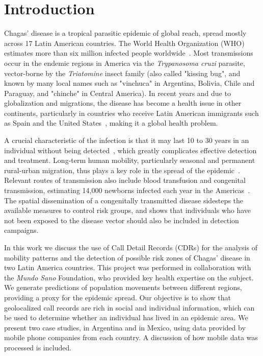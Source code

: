 \section{Introduction}

Chagas' disease is a tropical parasitic epidemic of global reach, spread mostly across 17 Latin American countries. The World Health Organization (WHO) estimates more than six million infected people worldwide~\cite{who2016}. Most transmissions occur in the endemic regions in America via the \textit{Trypanosoma cruzi} parasite, vector-borne by the \textit{Triatomine} insect family (also called "kissing bug", and known by many local names such as "vinchuca" in Argentina, Bolivia, Chile and Paraguay, and "chinche" in Central America). In recent years and due to globalization and migrations, the disease has become a health issue in other continents, particularly in countries who receive Latin American immigrants such as Spain and the United States~\cite{schmunis2010chagas}, making it a global health problem.

A crucial characteristic of the infection is that it may last 10 to 30 years in an individual without being detected~\cite{rassi2012american}, which greatly complicates effective detection and treatment. Long-term human mobility, particularly seasonal and permanent rural-urban migration, thus plays a key role in the spread of the epidemic~\cite{briceno2009chagas}. Relevant routes of transmission also include blood transfusion and congenital transmission, estimating 14,000 newborns infected each year in the Americas~\cite{OPS2006chagas}.
The spatial dissemination of a congenitally transmitted disease sidesteps the available measures to control risk groups, and shows that individuals who have not been exposed to the disease vector should also be included in detection campaigns.

In this work we discuss the use of Call Detail Records (CDRs) for the analysis of mobility patterns and the detection of possible risk zones of Chagas' disease in two Latin America countries. This project was performed in collaboration with the \textit{Mundo Sano} Foundation, who provided key health expertise on the subject. We generate predictions of population movements between different regions, providing a proxy for the epidemic spread. Our objective is to show that geolocalized call records are rich in social and individual information, which can be used to determine whether an individual has lived in an epidemic area. We present two case studies, in Argentina and in Mexico, using data provided by mobile phone companies from each country. A discussion of how mobile data was processed is included. 

